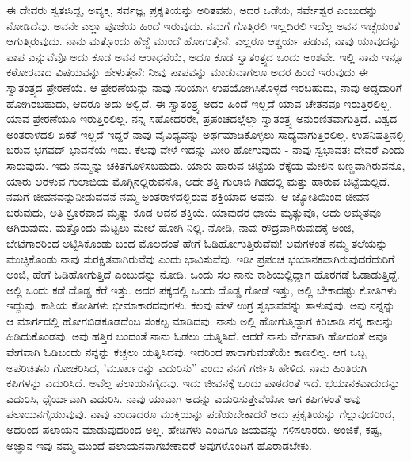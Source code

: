 ಈ ದೇವರು ಸ್ವತಃಸಿದ್ದ, ಅವ್ಯಕ್ತ, ಸರ್ವಜ್ಞ, ಪ್ರಕೃತಿಯನ್ನು ಅರಿತವನು, ಅದರ ಒಡೆಯ, ಸರ್ವೇಶ್ವರ ಎಂಬುದನ್ನು ನೋಡಿದೆವು. ಅವನೇ ಎಲ್ಲಾ ಪೂಜೆಯ ಹಿಂದೆ ಇರುವುದು. ನಮಗೆ ಗೊತ್ತಿರಲಿ ಇಲ್ಲದಿರಲಿ ಇದೆಲ್ಲ ಅವನ ಇಚ್ಛೆಯಂತೆ ಆಗುತ್ತಿರುವುದು. ನಾನು ಮತ್ತೊಂದು ಹೆಜ್ಜೆ ಮುಂದೆ ಹೋಗುತ್ತೇನೆ. ಎಲ್ಲರೂ ಆಶ್ಚರ್ಯ ಪಡುವ, ನಾವು ಯಾವುದನ್ನು ಪಾಪ ಎನ್ನುವೆವೊ ಅದು ಕೂಡ ಅವನ ಆರಾಧನೆಯೆ, ಅದೂ ಕೂಡ ಸ್ವಾತಂತ್ರ್ಯದ ಒಂದು ಅಂಶವೇ. ಇಲ್ಲಿ ನಾನು ಇನ್ನೂ ಕಠೋರವಾದ ವಿಷಯವನ್ನು ಹೇಳುತ್ತೇನೆ: ನೀವು ಪಾಪವನ್ನು ಮಾಡುವಾಗಲೂ ಅದರ ಹಿಂದೆ ಇರುವುದು ಈ ಸ್ವಾತಂತ್ರ್ಯದ ಪ್ರೇರಣೆಯೆ. ಆ ಪ್ರೇರಣೆಯನ್ನು ನಾವು ಸರಿಯಾಗಿ ಉಪಯೋಗಿಸಿಕೊಳ್ಳದೆ ಇರಬಹುದು, ನಾವು ಅಡ್ಡದಾರಿಗೆ ಹೋಗಿರಬಹುದು, ಆದರೂ ಅದು ಅಲ್ಲಿದೆ. ಈ ಸ್ವಾತಂತ್ರ್ಯ ಅದರ ಹಿಂದೆ ಇಲ್ಲದೆ ಯಾವ ಚೇತನವೂ ಇರುತ್ತಿರಲಿಲ್ಲ. ಯಾವ ಪ್ರೇರಣೆಯೂ ಇರುತ್ತಿರಲಿಲ್ಲ. ನನ್ನ ಸಹೋದರರೇ, ಪ್ರಪಂಚದಲ್ಲೆಲ್ಲಾ ಸ್ವಾತಂತ್ರ್ಯ ಅನುರಣಿತವಾಗುತ್ತಿದೆ. ವಿಶ್ವದ ಅಂತರಾಳದಲಿ ಏಕತೆ ಇಲ್ಲದೆ ಇದ್ದರೆ ನಾವು ವೈವಿಧ್ಯವನ್ನು ಅರ್ಥಮಾಡಿಕೊಳ್ಳಲು ಸಾಧ್ಯವಾಗುತ್ತಿರಲಿಲ್ಲ. ಉಪನಿಷತ್ತಿನಲ್ಲಿ ಬರುವ ಭಗವದ್ ಭಾವನೆಯೆ ಇದು. ಕೆಲವು ವೇಳೆ ಇದನ್ನು ಮೀರಿ ಹೋಗುವುದು - ನಾವು ಸ್ವಭಾವತಃ ದೇವರೆ ಎಂದು ಸಾರುವುದು. ಇದು ನಮ್ಮನ್ನು ಚಕಿತಗೊಳಿಸಬಹುದು. ಯಾರು ಹಾರುವ ಚಿಟ್ಟೆಯ ರೆಕ್ಕೆಯ ಮೇಲಿನ ಬಣ್ಣವಾಗಿರುವನೊ, ಯಾರು ಅರಳುವ ಗುಲಾಬಿಯ ಮೊಗ್ಗಿನಲ್ಲಿರುವನೊ, ಅದೇ ಶಕ್ತಿ ಗುಲಾಬಿ ಗಿಡದಲ್ಲಿ ಮತ್ತು ಹಾರುವ ಚಿಟ್ಟೆಯಲ್ಲಿದೆ. ನಮಗೆ ಜೀವನವನ್ನುನೀಡುವವನೆ ನಮ್ಮ ಅಂತರಾಳದಲ್ಲಿರುವ ಶಕ್ತಿಯಾದ ಅವನು. ಆ ಜ್ಯೋತಿಯಿಂದ ಜೀವನ ಬರುವುದು, ಅತಿ ಕ್ರೂರವಾದ ಮೃತ್ಯು ಕೂಡ ಅವನ ಶಕ್ತಿಯೆ. ಯಾವುದರ ಛಾಯೆ ಮೃತ್ಯುವೊ, ಅದು ಅಮೃತವೂ ಆಗಿರುವುದು. ಮತ್ತೊಂದು ಮೆಟ್ಟಲು ಮೇಲೆ ಹೋಗಿ ನಿಲ್ಲಿ. ನೋಡಿ, ನಾವು ರೌದ್ರವಾಗಿರುವುದಕ್ಕೆ ಅಂಜಿ, ಬೇಟೆಗಾರರಿಂದ ಅಟ್ಟಿಸಿಕೊಂಡು ಬಂದ ಮೊಲದಂತೆ ಹೇಗೆ ಓಡಿಹೋಗುತ್ತಿರುವೆವು! ಅವುಗಳಂತೆ ನಮ್ಮ ತಲೆಯನ್ನು ಮುಚ್ಚಿಕೊಂಡು ನಾವು ಸುರಕ್ಷಿತವಾಗಿರುವೆವು ಎಂದು ಭಾವಿಸುವೆವು. ಇಡೀ ಪ್ರಪಂಚ ಭಯಾನಕವಾಗಿರುವುದರೆದುರಿಗೆ ಅಂಜಿ, ಹೇಗೆ ಓಡಿಹೋಗುತ್ತಿದೆ ಎಂಬುದನ್ನು ನೋಡಿ. ಒಂದು ಸಲ ನಾನು ಕಾಶಿಯಲ್ಲಿದ್ದಾಗ ಹೊರಗಡೆ ಓಡಾಡುತ್ತಿದ್ದೆ. ಅಲ್ಲಿ ಒಂದು ಕಡೆ ದೊಡ್ಡ ಕೆರೆ ಇತ್ತು. ಅದರ ಪಕ್ಕದಲ್ಲಿ ಒಂದು ದೊಡ್ಡ ಗೋಡೆ ಇತ್ತು, ಅಲ್ಲಿ ಬೇಕಾದಷ್ಟು ಕೋತಿಗಳು ಇದ್ದುವು. ಕಾಶಿಯ ಕೋತಿಗಳು ಭೀಮಾಕಾರದವುಗಳು. ಕೆಲವು ವೇಳೆ ಉಗ್ರ ಸ್ವಭಾವವನ್ನು ತಾಳುವುವು. ಅವು ನನ್ನನ್ನು ಆ ಮಾರ್ಗದಲ್ಲಿ ಹೋಗಬಿಡಕೂಡದೆಂಬ ಸಂಕಲ್ಪ ಮಾಡಿದವು. ನಾನು ಅಲ್ಲಿ ಹೋಗುತ್ತಿದ್ದಾಗ ಕಿರಿಚಾಡಿ ನನ್ನ ಕಾಲನ್ನು ಹಿಡಿದುಕೊಂಡವು. ಅವು ಹತ್ತಿರ ಬಂದಂತೆ ನಾನು ಓಡಲು ಯತ್ನಿಸಿದೆ. ಆದರೆ ನಾನು ವೇಗವಾಗಿ ಹೋದಂತೆ ಅವೂ ವೇಗವಾಗಿ ಓಡಿಬಂದು ನನ್ನನ್ನು ಕಚ್ಚಲು ಯತ್ನಿಸಿದವು. ಇದರಿಂದ ಪಾರಾಗುವಂತೆಯೇ ಕಾಣಲಿಲ್ಲ. ಆಗ ಒಬ್ಬ ಅಪರಿಚಿತನು ಗೋಚರಿಸಿದ, 'ಮೂರ್ಖರನ್ನು ಎದುರಿಸು'' ಎಂದು ನನಗೆ ಗರ್ಜಿಸಿ ಹೇಳಿದ. ನಾನು ಹಿಂತಿರುಗಿ ಕಪಿಗಳನ್ನು ಎದುರಿಸಿದೆ. ಅವೆಲ್ಲ ಪಲಾಯನಗೈದವು. ಇದು ಜೀವನಕ್ಕೆ ಒಂದು ಪಾಠದಂತೆ ಇದೆ. ಭಯಾನಕವಾದುದನ್ನು ಎದುರಿಸಿ, ಧೈರ್ಯವಾಗಿ ಎದುರಿಸಿ. ನಾವು ಯಾವಾಗ ಅದನ್ನು ಎದುರಿಸುತ್ತೇವೆಯೋ ಆಗ ಕಪಿಗಳಂತೆ ಅವು ಪಲಾಯನಗೈಯುವುವು. ನಾವು ಎಂದಾದರೂ ಮುಕ್ತಿಯನ್ನು ಪಡೆಯಬೇಕಾದರೆ ಅದು ಪ್ರಕೃತಿಯನ್ನು ಗೆಲ್ಲುವುದರಿಂದ, ಅದರಿಂದ ಪಲಾಯನ ಮಾಡುವುದರಿಂದ ಅಲ್ಲ. ಹೇಡಿಗಳು ಎಂದಿಗೂ ಜಯವನ್ನು ಗಳಿಸಲಾರರು. ಅಂಜಿಕೆ, ಕಷ್ಟ, ಅಜ್ಞಾನ ಇವು ನಮ್ಮ ಮುಂದೆ ಪಲಾಯನವಾಗಬೇಕಾದರೆ ಅವುಗಳೊಂದಿಗೆ ಹೊರಾಡಬೇಕು.

